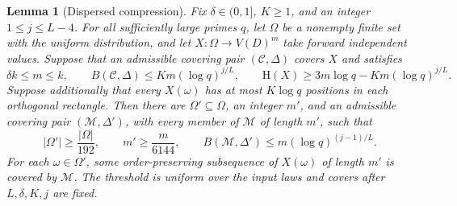 \documentclass[11pt,a4paper]{article}
\numberwithin{equation}{section}
\newtheorem{lemma}[theorem]{Lemma}
\newcommand{\HH}{\mathrm H}
\newcommand{\cC}{\mathcal C}
\begin{document}
\begin{lemma}[Dispersed compression]\label{lem:dispersed}
Fix $\delta\in(0,1]$, $K\ge1$, and an integer
$1\le j\le L-4$.
For all sufficiently large primes $q$, let $\Omega$ be a
nonempty finite set with the uniform distribution, and let
$X:\Omega\to V(D)^m$ take forward independent values.
Suppose that an admissible covering pair $(\cC,\Delta)$ covers
$X$ and satisfies
\begin{equation}\label{eq:dispersed-input}
 \delta k\le m\le k,\qquad
 B(\cC,\Delta)\le Km(\log q)^{j/L},\qquad
 \HH(X)\ge3m\log q-Km(\log q)^{j/L}.
\end{equation}
Suppose additionally that every $X(\omega)$ has at most
$K\log q$ positions in each orthogonal rectangle.
Then there are $\Omega'\subseteq\Omega$, an integer $m'$, and
an admissible covering pair $(\mathcal M,\Delta')$, with every
member of $\mathcal M$ of length $m'$, such that
\begin{equation}\label{eq:dispersed-output}
 |\Omega'|\ge\frac{|\Omega|}{192},\qquad
 m'\ge\frac{m}{6144},\qquad
 B(\mathcal M,\Delta')\le m(\log q)^{(j-1)/L}.
\end{equation}
For each $\omega\in\Omega'$, some order-preserving subsequence
of $X(\omega)$ of length $m'$ is covered by $\mathcal M$.
The threshold is uniform over the input laws and covers after
$L,\delta,K,j$ are fixed.
\end{lemma}
\end{document}
